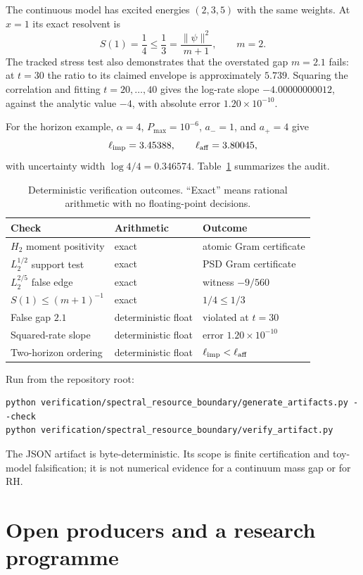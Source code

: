 \documentclass[11pt,a4paper]{article}
\theoremstyle{definition}
\theoremstyle{remark}
\begin{document}
The continuous model has excited energies $(2,3,5)$ with the same weights.
At $x=1$ its exact resolvent is
\[
  S(1)=\frac14\leq\frac13=\frac{\|\psi\|^2}{m+1},
  \qquad m=2.
\]
The tracked stress test also demonstrates that the overstated gap $m=2.1$
fails: at $t=30$ the ratio to its claimed envelope is approximately $5.739$.
Squaring the correlation and fitting $t=20,\ldots,40$ gives the log-rate slope
$-4.00000000012$, against the analytic value $-4$, with absolute error
$1.20\times10^{-10}$.

For the horizon example, $\alpha=4$, $P_{\max}=10^{-6}$,
$a_-=1$, and $a_+=4$ give
\[
  \ell_{\rm imp}=3.45388,\qquad
  \ell_{\rm aff}=3.80045,
\]
with uncertainty width $\log 4/4=0.346574$.  Table~\ref{tab:checks}
summarizes the audit.

\begin{table}[ht]
\centering
\caption{Deterministic verification outcomes.  ``Exact'' means rational
arithmetic with no floating-point decisions.}
\label{tab:checks}
\begin{tabular}{@{}lll@{}}
\toprule
Check & Arithmetic & Outcome \\
\midrule
$H_2$ moment positivity & exact & atomic Gram certificate \\
$L_2^{1/2}$ support test & exact & PSD Gram certificate \\
$L_2^{2/5}$ false edge & exact & witness $-9/560$ \\
$S(1)\leq(m+1)^{-1}$ & exact & $1/4\leq1/3$ \\
False gap $2.1$ & deterministic float & violated at $t=30$ \\
Squared-rate slope & deterministic float & error $1.20\times10^{-10}$ \\
Two-horizon ordering & deterministic float & $\ell_{\rm imp}<\ell_{\rm aff}$ \\
\bottomrule
\end{tabular}
\end{table}

Run from the repository root:
\begin{verbatim}
python verification/spectral_resource_boundary/generate_artifacts.py --check
python verification/spectral_resource_boundary/verify_artifact.py
\end{verbatim}
The JSON artifact is byte-deterministic.  Its scope is finite certification and
toy-model falsification; it is not numerical evidence for a continuum mass gap
or for RH.

\section{Open producers and a research programme}
\label{sec:open}
\end{document}
